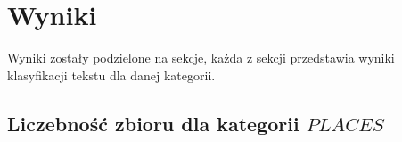 \documentclass{classrep}
\begin{document}

\section{Wyniki}
Wyniki zostały podzielone na sekcje, każda z sekcji przedstawia wyniki klasyfikacji tekstu dla danej kategorii.

\subsection{Liczebność zbioru dla kategorii $PLACES$}
\end{document}
